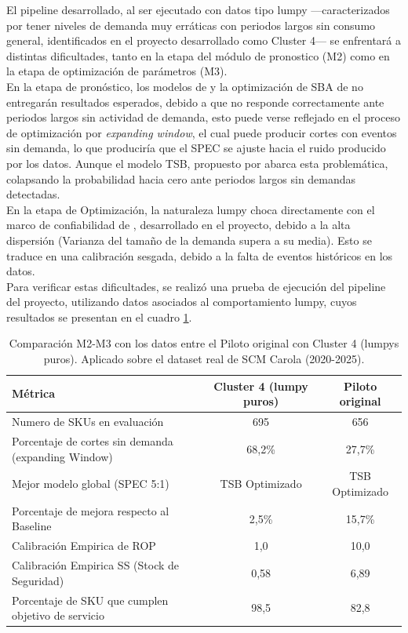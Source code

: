 \documentclass[10pt,a4paper]{article}
\begin{document}
\begin{enumerate}
El pipeline desarrollado, al ser ejecutado con datos tipo lumpy ---caracterizados por tener niveles de demanda muy erráticas con periodos largos sin consumo general, identificados en el proyecto desarrollado como Cluster 4--- se enfrentará a distintas dificultades, tanto en la etapa del módulo de pronostico (M2) como en la etapa de optimización de parámetros (M3).\\
En la etapa de pronóstico, los modelos de \cite{croston1972} y la optimización de SBA de \cite{syntetos2005} no entregarán resultados esperados, debido a que no responde correctamente ante periodos largos sin actividad de demanda, esto puede verse reflejado en el proceso de optimización por \textit{expanding window}, el cual puede producir cortes con eventos sin demanda, lo que produciría que el SPEC se ajuste hacia el ruido producido por los datos. Aunque el modelo TSB, propuesto por \cite{teunter2011} abarca esta problemática, colapsando la probabilidad hacia cero ante periodos largos sin demandas detectadas.\\
En la etapa de Optimización, la naturaleza lumpy choca directamente con el marco de confiabilidad de \cite{louit2011}, desarrollado en el proyecto, debido a la alta dispersión (Varianza del tamaño de la demanda supera a su media). Esto se traduce en una calibración sesgada, debido a la falta de eventos históricos en los datos.\\
Para verificar estas dificultades, se realizó una prueba de ejecución del pipeline del proyecto, utilizando datos asociados al comportamiento lumpy, cuyos resultados se presentan en el cuadro \ref{tab:resultadoscluster4}.

\begin{table}[H]
\centering
\caption{Comparación M2-M3 con los datos entre el Piloto original con Cluster 4 (lumpys puros). Aplicado sobre el dataset real de SCM Carola (2020-2025).}
\label{tab:resultadoscluster4}
\begin{tabularx}{\textwidth}{X c c}
\hline
\textbf{Métrica} & \textbf{Cluster 4 (lumpy puros)} & \textbf{Piloto original} \\
\hline
Numero de SKUs en evaluación & 695 & 656 \\
Porcentaje de cortes sin demanda (expanding Window) & 68,2\% & 27,7\% \\
Mejor modelo global (SPEC 5:1) & TSB Optimizado & TSB Optimizado \\
Porcentaje de mejora respecto al Baseline & 2,5\% & 15,7\% \\
Calibración Empirica de ROP & 1,0 & 10,0 \\
Calibración Empirica SS (Stock de Seguridad) & 0,58 & 6,89 \\
Porcentaje de SKU que cumplen objetivo de servicio & 98,5 & 82,8 \\
\hline
\end{tabularx}
\end{table}


\end{enumerate}
\end{document}
